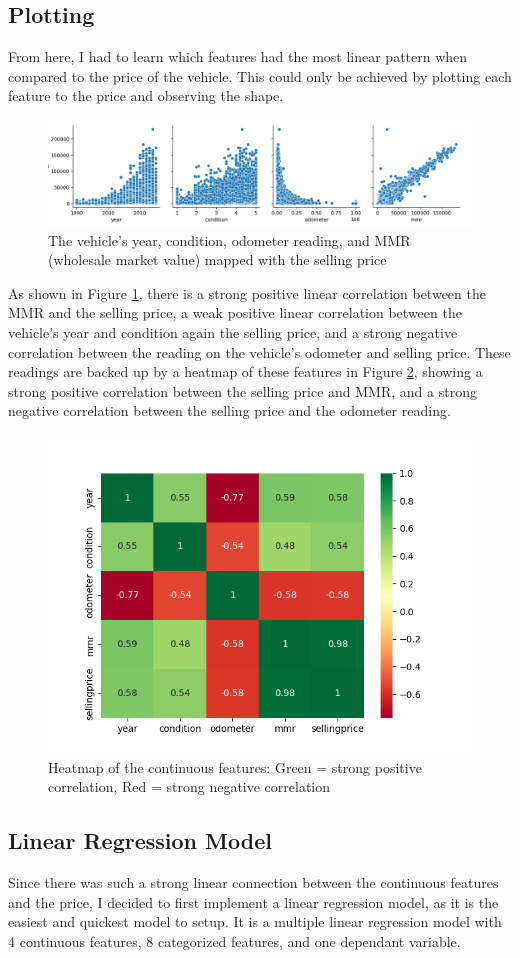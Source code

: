 \documentclass[compsoc]{IEEEtran}
\begin{document}
\subsection{Plotting}
From here, I had to learn which features had the most linear pattern when compared to the price of the vehicle. This could only be achieved by plotting each feature to the price and observing the shape.
\begin{figure}[h]
    \centering
    \includegraphics[width=.45\textwidth]{images/linearity.png}
    \caption{The vehicle's year, condition, odometer reading, and MMR (wholesale market value) mapped with the selling price}
    \label{fig:linearity}
\end{figure}
As shown in Figure \ref{fig:linearity}, there is a strong positive linear correlation between the MMR and the selling price, a weak positive linear correlation between the vehicle's year and condition again the selling price, and a strong negative correlation between the reading on the vehicle's odometer and selling price. These readings are backed up by a heatmap of these features in Figure \ref{fig:heat}, showing a strong positive correlation between the selling price and MMR, and a strong negative correlation between the selling price and the odometer reading.
\begin{figure}[h]
    \centering
    \includegraphics[width=.45\textwidth]{images/heatmap.png}
    \caption{Heatmap of the continuous features: Green = strong positive correlation, Red = strong negative correlation}
    \label{fig:heat}
\end{figure}
\subsection{Linear Regression Model}
Since there was such a strong linear connection between the continuous features and the price, I decided to first implement a linear regression model, as it is the easiest and quickest model to setup. It is a multiple linear regression model with 4 continuous features, 8 categorized features, and one dependant variable.
\end{document}

